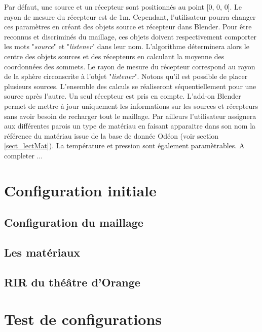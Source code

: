 Par défaut, une source et un récepteur sont positionnés au point [0, 0, 0]. Le rayon de mesure du récepteur est de 1m. Cependant, l'utilisateur pourra changer ces paramètres en créant des objets source et récepteur dans Blender. Pour être reconnus et discriminés du maillage, ces objets doivent respectivement comporter les mots "\textit{source}" et "\textit{listener}" dans leur nom. L'algorithme déterminera alors le centre des objets sources et des récepteurs en calculant la moyenne des coordonnées des sommets. Le rayon de mesure du récepteur correspond au rayon de la sphère circonscrite à l'objet "\textit{listener}". Notons qu'il est possible de placer plusieurs sources. L'ensemble des calculs se réaliseront séquentiellement pour une source après l'autre. Un seul récepteur est pris en compte. L'add-on Blender permet de mettre à jour uniquement les informations sur les sources et récepteurs sans avoir besoin de recharger tout le maillage.
Par ailleurs l'utilisateur assignera aux différentes parois un type de matériau en faisant apparaitre dans son nom la référence du matériau issue de la base de donnée Odéon (voir section \ref{sect_lectMat}). La température et pression sont également paramètrables.
A completer ...

	
			
	
\chapter{Configuration initiale}
	\minitoc
	\newpage
	
	\section{Configuration du maillage}
	\section{Les matériaux}
	\section{RIR du théâtre d'Orange}
		
	\chapter{Test de configurations}
		\minitoc
		\newpage
	
